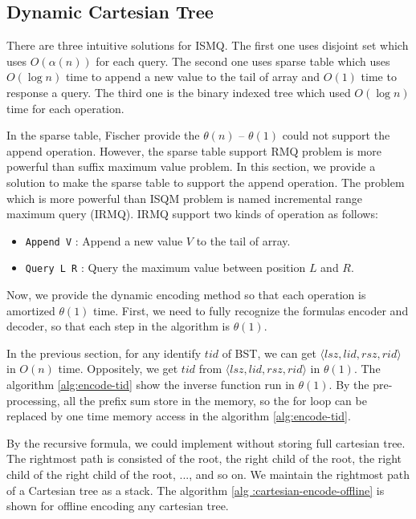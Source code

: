 

\subsection{Dynamic Cartesian Tree}

There are three intuitive solutions for ISMQ.  The first one uses
disjoint set which uses $O(\alpha(n))$ for each query.  The second one
uses sparse table which uses $O(\log n)$ time to append a new value to
the tail of array and $O(1)$ time to response a query.  The third one
is the binary indexed tree which used $O(\log n)$ time for each
operation.

In the sparse table, Fischer provide the $\theta(n)$ -- $\theta(1)$
could not support the append operation.  However, the sparse table
support RMQ problem is more powerful than suffix maximum value
problem.  In this section, we provide a solution to make the sparse
table to support the append operation.  The problem which is more
powerful than ISQM problem is named incremental range maximum query
(IRMQ).  IRMQ support two kinds of operation as follows:

\begin{itemize}
  \item 
  	\texttt{Append V} : Append a new value $V$ to the tail of array.

  \item
    \texttt{Query L R} : Query the maximum value between position $L$
and $R$. 

\end{itemize}

Now, we provide the dynamic encoding method so that each operation is
amortized $\theta(1)$ time.  First, we need to fully recognize the
formulas encoder and decoder, so that each step in the algorithm is
$\theta(1)$.

In the previous section, for any identify $\mathit{tid}$ of BST, we
can get
$\langle\mathit{lsz},\mathit{lid},\mathit{rsz},\mathit{rid}\rangle$ in
$O(n)$ time.  Oppositely, we get $\mathit{tid}$ from
$\langle\mathit{lsz},\mathit{lid},\mathit{rsz},\mathit{rid}\rangle$ in
$\theta(1)$.  The algorithm \ref{alg:encode-tid} show the inverse
function run in $\theta(1)$.  By the pre-processing, all the prefix
sum store in the memory, so the for loop can be replaced by one time
memory access in the algorithm \ref{alg:encode-tid}.



By the recursive formula,  we could implement without storing full
cartesian tree.  The rightmost path is consisted of the root, the
right child of the root, the right child of the right child of the
root, ..., and so on.  We maintain the rightmost path of a Cartesian
tree as a stack.  The algorithm \ref{alg :cartesian-encode-offline} is
shown for offline encoding any cartesian tree.


